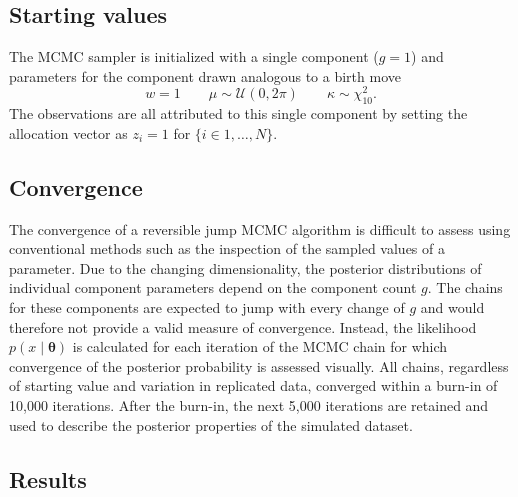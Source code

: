 \subsection{Starting values}
\label{starting-values}
The MCMC sampler is initialized with a single component ($g = 1$) and parameters for the component drawn analogous to a birth move
\begin{equation}
w = 1 \qquad \mu \sim \mathcal{U}(0, 2\pi) \qquad \kappa \sim \chi^2_{10}.
\end{equation}
The observations are all attributed to this single component by setting the allocation vector as $z_i = 1$ for $\{i \in 1,\dotsc,N\}$.

\subsection{Convergence}
The convergence of a reversible jump MCMC algorithm is difficult to assess using conventional methods such as the inspection of the sampled values of a parameter. Due to the changing dimensionality, the posterior distributions of individual component parameters depend on the component count $g$. The chains for these components are expected to jump with every change of $g$ and would therefore not provide a valid measure of convergence. Instead, the likelihood $p(x \mid \bm \theta)$ is calculated for each iteration of the MCMC chain for which convergence of the posterior probability is assessed visually. All chains, regardless of starting value and variation in replicated data, converged within a burn-in of 10,000 iterations. After the burn-in, the next 5,000 iterations are retained and used to describe the posterior properties of the simulated dataset.

\subsection{Results}

